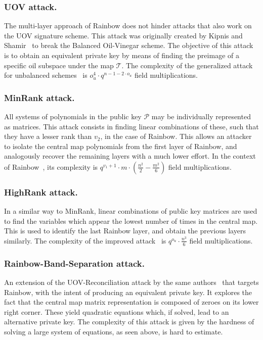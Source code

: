 \documentclass[draft, 12pt, a4paper, oneside]{memoir}
\theoremstyle{definition}
\theoremstyle{remark}
\begin{document}
\subsubsection{UOV attack.} The multi-layer approach of Rainbow does not hinder
attacks that also work on the UOV signature scheme. This attack was originally
created by Kipnis and Shamir~\cite{Kipnis:199808} to break the Balanced
Oil-Vinegar scheme. The objective of this attack is to obtain an equivalent
private key by means of finding the preimage of a specific oil subspace under
the map $\mathcal{T}$. The complexity of the generalized attack for unbalanced
schemes~\cite{Kipnis:199904} is
$o_{u}^{4} \cdot q^{n - 1 - 2 \cdot o_{u}}$ field multiplications.

\subsubsection{MinRank attack.} All systems of polynomials in the public key
$\mathcal{P}$ may be individually represented as matrices. This attack
consists in finding linear combinations of these, such that they have a lesser
rank than $v_{2}$, in the case of Rainbow. This allows an attacker to isolate
the central map polynomials from the first layer of Rainbow, and analogously
recover the remaining layers with a much lower effort. In the context of
Rainbow~\cite{Billet:200609}, its complexity is
$q^{v_{1} + 1} \cdot m \cdot (\frac{n^{2}}{2} - \frac{m^{2}}{6})$ field
multiplications.

\subsubsection{HighRank attack.} In a similar way to MinRank, linear
combinations of public key matrices are used to find the variables which
appear the lowest number of times in the central map. This is used to identify
the last Rainbow layer, and obtain the previous layers similarly. The
complexity of the improved attack~\cite{Ding:200806} is
$q^{o_{u}} \cdot \frac{n^{3}}{6}$ field multiplications.

\subsubsection{Rainbow-Band-Separation attack.} An extension of the
UOV-Reconciliation attack by the same authors~\cite{Ding:200806} that
targets Rainbow, with the intent of producing an equivalent private key. It
explores the fact that the central map matrix representation is composed of
zeroes on its lower right corner. These yield quadratic equations which, if
solved, lead to an alternative private key. The complexity of this attack is
given by the hardness of solving a large system of equations, as seen
above, is hard to estimate.
\end{document}
